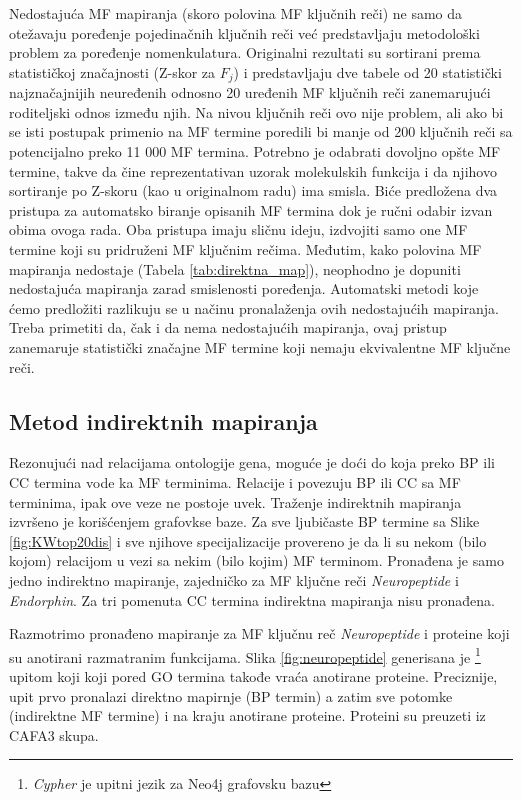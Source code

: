 Nedostajuća MF mapiranja (skoro polovina MF ključnih reči) ne samo da otežavaju
poređenje pojedinačnih ključnih reči već predstavljaju metodološki problem za
poređenje nomenkulatura.  Originalni rezultati su sortirani prema statističkoj
značajnosti (Z-skor za $F_j$) i predstavljaju dve tabele od 20 statistički
najznačajnijih neuređenih odnosno 20 uređenih MF ključnih reči zanemarujući
roditeljski odnos između njih. Na nivou ključnih reči ovo nije problem, ali ako
bi se isti postupak primenio na MF termine poredili bi manje od 200 ključnih
reči sa potencijalno preko 11 000 MF termina. Potrebno je odabrati dovoljno
opšte MF termine, takve da čine reprezentativan uzorak molekulskih funkcija i
da njihovo sortiranje po Z-skoru (kao u originalnom radu) ima smisla.  Biće
predložena dva pristupa za automatsko biranje opisanih MF termina dok je ručni
odabir izvan obima ovoga rada.  Oba pristupa imaju sličnu ideju, izdvojiti samo
one MF termine koji su pridruženi MF ključnim rečima. Međutim, kako polovina MF
mapiranja nedostaje (Tabela \ref{tab:direktna_map}), neophodno je dopuniti
nedostajuća mapiranja zarad smislenosti poređenja.  Automatski metodi koje ćemo
predložiti razlikuju se u načinu pronalaženja ovih nedostajućih mapiranja.
Treba primetiti da, čak i da nema nedostajućih mapiranja, ovaj pristup
zanemaruje statistički značajne MF termine koji nemaju ekvivalentne MF ključne
reči. 



\clearpage

\subsection{Metod indirektnih mapiranja}

Rezonujući nad relacijama ontologije gena, moguće je doći do
 koja preko BP ili CC termina vode ka MF
terminima. Relacije  i  povezuju BP ili CC
sa MF terminima, ipak ove veze ne postoje uvek.  Traženje indirektnih mapiranja
izvršeno je korišćenjem  grafovkse baze. Za sve
ljubičaste BP termine sa Slike \ref{fig:KWtop20dis} i sve njihove
specijalizacije provereno je da li su nekom (bilo kojom) relacijom u vezi sa
nekim (bilo kojim) MF terminom. Pronađena je samo jedno indirektno mapiranje,
zajedničko za MF ključne reči \textit{Neuropeptide} i \textit{Endorphin}. Za tri
pomenuta CC termina indirektna mapiranja nisu pronađena. 


Razmotrimo pronađeno mapiranje za MF ključnu reč \textit{Neuropeptide} i
proteine koji su anotirani razmatranim funkcijama. Slika \ref{fig:neuropeptide}
generisana je \footnote{\textit{Cypher} je upitni jezik za
Neo4j grafovsku bazu} upitom koji koji pored GO termina takođe vraća anotirane
proteine. Preciznije, upit prvo pronalazi direktno mapirnje (BP termin)  a
zatim sve potomke (indirektne MF termine) i na kraju anotirane proteine.
Proteini su preuzeti iz CAFA3 skupa. 

